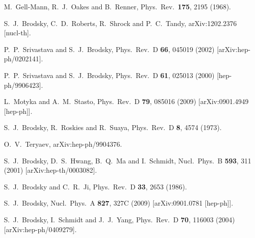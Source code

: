 \documentclass[prd,aps,onecolumn,nofootinbib]{revtex4}
\begin{document}
\begin{thebibliography}{99}
 
  M.~Gell-Mann, R.~J.~Oakes and B.~Renner,
  Phys.\ Rev.\  {\bf 175}, 2195 (1968).
  
  
  S.~J.~Brodsky, C.~D.~Roberts, R.~Shrock and P.~C.~Tandy,
 arXiv:1202.2376 [nucl-th].

  P.~P.~Srivastava and S.~J.~Brodsky,
  Phys.\ Rev.\  D {\bf 66}, 045019 (2002)
  [arXiv:hep-ph/0202141].
  
  P.~P.~Srivastava and S.~J.~Brodsky,
  Phys.\ Rev.\ D {\bf 61}, 025013 (2000)
  [hep-ph/9906423].

  L.~Motyka and A.~M.~Stasto,
  Phys.\ Rev.\  D {\bf 79}, 085016 (2009)
  [arXiv:0901.4949 [hep-ph]].
  
  S.~J.~Brodsky, R.~Roskies and R.~Suaya,
  Phys.\ Rev.\  D {\bf 8}, 4574 (1973).

  O.~V.~Teryaev,
  arXiv:hep-ph/9904376.

  S.~J.~Brodsky, D.~S.~Hwang, B.~Q.~Ma and I.~Schmidt,
  Nucl.\ Phys.\  B {\bf 593}, 311 (2001)
  [arXiv:hep-th/0003082].

  S.~J.~Brodsky and C.~R.~Ji,
  Phys.\ Rev.\  D {\bf 33}, 2653 (1986).

  S.~J.~Brodsky,
  Nucl.\ Phys.\  A {\bf 827}, 327C (2009)
  [arXiv:0901.0781 [hep-ph]].

  S.~J.~Brodsky, I.~Schmidt and J.~J.~Yang,
  Phys.\ Rev.\  D {\bf 70}, 116003 (2004)
  [arXiv:hep-ph/0409279].
  

\end{thebibliography}
\end{document}
